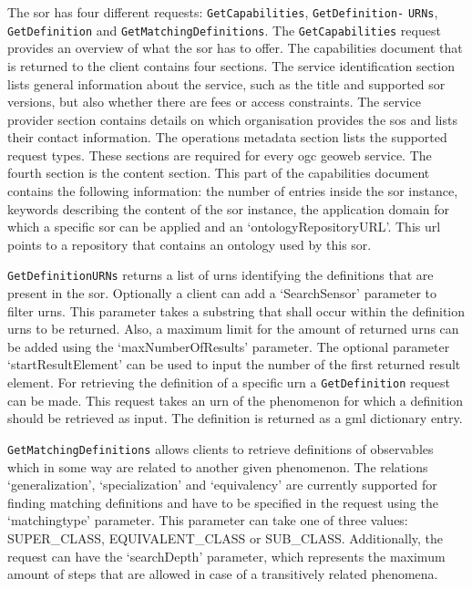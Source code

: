 The \ac{sor} has four different requests: \texttt{GetCapabilities}, \texttt{GetDefinition-} \texttt{URNs}, \texttt{GetDefinition} and \texttt{GetMatchingDefinitions}. The \texttt{GetCapabilities} request provides an overview of what the \ac{sor} has to offer. The capabilities document that is returned to the client contains four sections. The service identification section lists general information about the service, such as the title and supported \ac{sor} versions, but also whether there are fees or access constraints. The service provider section contains details on which organisation provides the \ac{sos} and lists their contact information. The operations metadata section lists the supported request types. These sections are required for every \ac{ogc} geoweb service. The fourth section is the content section. This part of the capabilities document contains the following information: the number of entries inside the \ac{sor} instance, keywords describing the content of the \ac{sor} instance, the application domain for which a specific \ac{sor} can be applied and an `ontologyRepositoryURL'. This \ac{url} points to a repository that contains an ontology used by this \ac{sor}.

\texttt{GetDefinitionURNs} returns a list of \acp{urn} identifying the definitions that are present in the \ac{sor}. Optionally a client can add a `SearchSensor' parameter to filter \acp{urn}. This parameter takes a substring that shall occur within the definition \acp{urn} to be returned. Also, a maximum limit for the amount of returned \acp{urn} can be added using the `maxNumberOfResults' parameter. The optional parameter `startResultElement' can be used to input the number of the first returned result element. For retrieving the definition of a specific \ac{urn} a \texttt{GetDefinition} request can be made. This request takes an \ac{urn} of the phenomenon for which a definition should be retrieved as input. The definition is returned as a \ac{gml} dictionary entry. 

\texttt{GetMatchingDefinitions} allows clients to retrieve definitions of observables which in some way are related to another given phenomenon. The relations `generalization', `specialization' and `equivalency' are currently supported for finding matching definitions \citep{SW:OGC4} and have to be specified in the request using the `matchingtype' parameter. This parameter can take one of three values: SUPER\_CLASS, EQUIVALENT\_CLASS or SUB\_CLASS. Additionally, the request can have the `searchDepth' parameter, which represents the maximum amount of steps that are allowed in case of a transitively related phenomena.  

